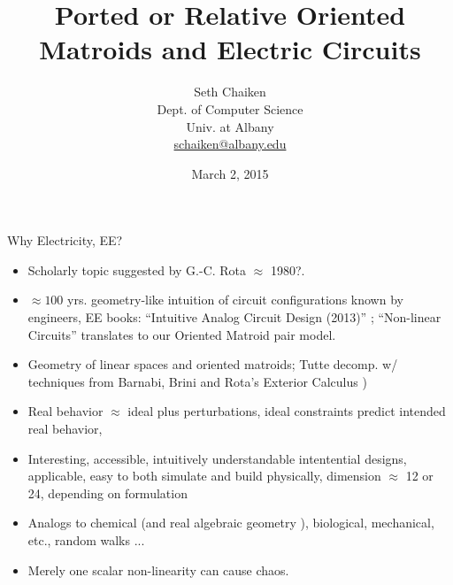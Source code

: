 \documentclass{article}
\title{Ported or Relative Oriented Matroids and Electric Circuits}
\author{Seth Chaiken\\
Dept. of Computer Science\\
Univ. at Albany\\
\url{schaiken@albany.edu}
}
\date{March 2, 2015}
\newcommand{\Remph}[1]{{\color{red}#1}}
\begin{document}
\begin{frame}
 \titlepage
\end{frame}


\begin{frame}{Why Electricity, EE?}
\begin{itemize}
\item Scholarly topic suggested by G.-C. Rota $\approx$ 1980?.
\item $\approx 100$ yrs. geometry-like intuition of
circuit configurations known by engineers, EE books:
``Intuitive Analog Circuit Design (2013)''
\cite{intuitAna}; ``Non-linear Circuits'' \cite{HaslerNeirynck}
translates to our Oriented Matroid pair model.

\item Geometry of linear spaces and oriented matroids;
Tutte decomp. w/
techniques from Barnabi, Brini and Rota's Exterior Calculus 
\cite{exteriorCalc})

\item
Real behavior $\approx$ ideal plus perturbations,
ideal constraints predict intended real behavior,

\item 
Interesting, accessible, intuitively understandable
intentential designs, applicable,
easy to both simulate and build physically, dimension
$\approx$
12 or 24, depending on formulation
\item
Analogs to chemical (and real algebraic geometry 
\cite{signsInChemRAG}), biological, mechanical, etc., random walks ...
\item
Merely one scalar non-linearity can cause chaos.
\end{itemize}
\end{frame}
\end{document}
